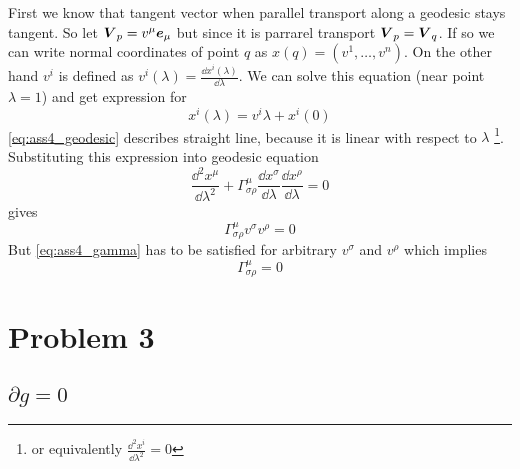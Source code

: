 First we know that tangent vector when parallel transport along a geodesic stays
tangent. So let $\boldsymbol{V}_p=v^\mu \boldsymbol{e}_\mu$ but since it is parrarel transport
$\boldsymbol{V}_p=\boldsymbol{V}_q$. If so we can write normal coordinates of point $q$ as
$x(q)=(v^1,\dots,v^n)$. On the other hand $v^i$ is defined as
$v^i(\lambda)=\frac{\dd x^i(\lambda)}{\dd \lambda}$. We can solve this equation
(near point $\lambda=1$) and get expression for
%
\begin{equation}
    x^i(\lambda) = v^i \lambda + x^i(0)
    \label{eq:ass4_geodesic}
\end{equation}
%
\autoref{eq:ass4_geodesic} describes straight line, because it is linear with
respect to $\lambda$ \footnote{or equivalently $\frac{\dd^2 x^i}{\dd
            \lambda^2}=0$}.
%
Substituting this expression into geodesic equation
%
\begin{equation}
    \frac{\dd^2 x^\mu}{\dd \lambda^2} + \Gamma_{\sigma\rho}^\mu\frac{\dd x^\sigma}{\dd \lambda}\frac{\dd x^\rho}{\dd \lambda} = 0
\end{equation}
%
gives
%
\begin{equation}
    \Gamma_{\sigma\rho}^\mu v^\sigma v^\rho = 0
    \label{eq:ass4_gamma}
\end{equation}
%
But \autoref{eq:ass4_gamma} has to be satisfied for arbitrary $v^\sigma$ and
$v^\rho$ which implies
%
\begin{equation}
    \boxed{\Gamma_{\sigma\rho}^\mu = 0}
\end{equation}
%
\section*{Problem 3}

\subsection{\texorpdfstring{$\partial g = 0$}{TEXT}}

